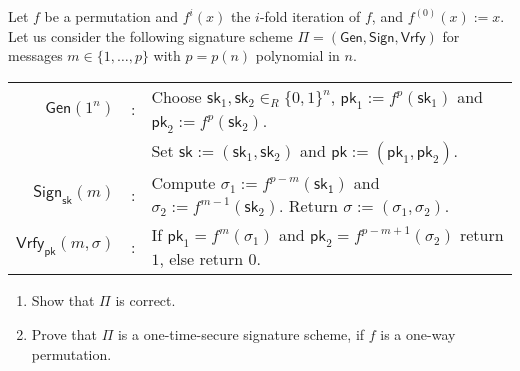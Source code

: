 \documentclass[a4paper,10pt,landscape,twocolumn]{scrartcl}
\begin{document}
\begin{exercise}

Let $f$ be a permutation and $f^i(x)$ the $i$-fold iteration of $f$,
and $f^{(0)}(x) := x$. Let us consider the following signature scheme
$\Pi = (\mathsf{Gen},\mathsf{Sign},\mathsf{Vrfy})$ for messages $m \in \{1, \ldots, p\}$ with $p = p(n)$ polynomial in $n$.
\begin{center}\vspace{-1em}
\begin{tabular}{rcl}
  $\mathsf{Gen}(1^n)$ & : &
    Choose $\mathsf{sk}_1,\mathsf{sk}_2 \in_R \{0,1\}^n$, $\mathsf{pk}_1 := f^p(\mathsf{sk}_1)$ and $\mathsf{pk}_2 := f^p(\mathsf{sk}_2)$. \\
    & & Set $\mathsf{sk} := (\mathsf{sk}_1,\mathsf{sk}_2)$ and $\mathsf{pk} := (\mathsf{pk}_1,\mathsf{pk}_2)$.\\[5pt]
  $\mathsf{Sign}_{\mathsf{sk}}(m)$ & : &
    Compute $\sigma_1 := f^{p-m}(\mathsf{sk_1})$ and $\sigma_2 := f^{m-1}(\mathsf{sk}_2)$. Return $\sigma := (\sigma_1,\sigma_2)$.\\[5pt]
  $\mathsf{Vrfy}_{\mathsf{pk}}(m,\sigma)$ & : &
    If $\mathsf{pk}_1 =
  f^m(\sigma_1)$ and $\mathsf{pk}_2 = f^{p-m+1}(\sigma_2)$ return $1$,
  else return $0$.
\end{tabular}
\end{center}
\begin{enumerate}
\item Show that $\Pi$ is correct.
\item Prove that $\Pi$ is a one-time-secure signature scheme, if
  $f$ is a one-way permutation.
\end{enumerate}



\end{exercise}
\end{document}

